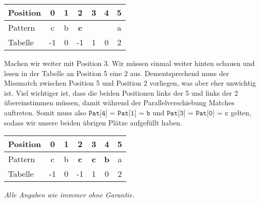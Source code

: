 \documentclass[a4paper, 12pt]{article}
\begin{document}
	\begin{center}
		\begin{tabular}{l|cccccc}
			Position & 0 & 1 & 2 & 3 & 4 & 5 \\  \hline
			Pattern & c & b & \textbf{c} & & & a \\ \hline
			Tabelle & -1 & 0 & -1 & 1 & 0 & 2
		\end{tabular}
	\end{center}

	Machen wir weiter mit Position 3. Wir müssen einmal weiter hinten schauen und lesen in der Tabelle an Position 5 eine 2 aus. Dementsprechend muss der Missmatch zwischen Position 5 und Position 2 vorliegen, was aber eher unwichtig ist. Viel wichtiger ist, dass die beiden Positionen links der 5 und links der 2 übereinstimmen müssen, damit während der Parallelverschiebung Matches auftreten. Somit muss also $\texttt{Pat[4] = Pat[1] = b}$ und $\texttt{Pat[3] = Pat[0] = c}$ gelten, sodass wir unsere beiden übrigen Plätze aufgefüllt haben.
	
	\begin{center}
		\begin{tabular}{l|cccccc}
			Position & 0 & 1 & 2 & 3 & 4 & 5 \\  \hline
			Pattern & c & b & \textbf{c} & \textbf{c} & \textbf{b} & a \\ \hline
			Tabelle & -1 & 0 & -1 & 1 & 0 & 2
		\end{tabular}
	\end{center}

	\vspace{15em}
	\textit{Alle Angaben wie immmer ohne Garantie.}
\end{document}
